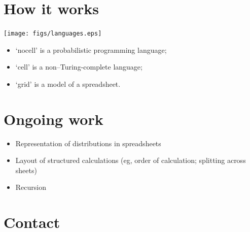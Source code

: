 \documentclass[twocolumn, 12pt]{article}
\begin{document}
\section*{How it works}
\footnotesize
\begin{center}
\texttt{[image: figs/languages.eps]}
\end{center}
\begin{itemize}[itemsep=0.4ex]
\item ‘nocell’ is a probabilistic programming language;
\item ‘cell’ is a non--Turing-complete language;
\item ‘grid’ is a model of a spreadsheet.
\end{itemize}

\section*{Ongoing work}
\begin{itemize}[itemsep=0.4ex]
\item Representation of distributions in spreadsheets
\item Layout of structured calculations (eg, order of calculation; splitting
  across sheets)  
\item Recursion
\end{itemize}
  
\vfill
\section*{Contact}
\normalsize
\end{document}
